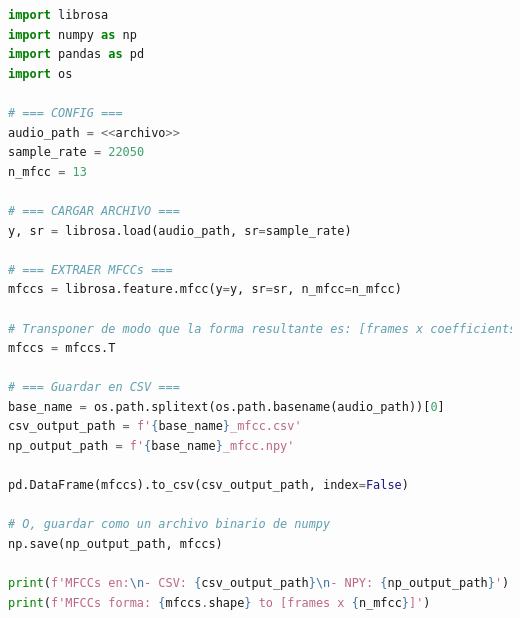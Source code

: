 \documentclass[12pt]{report}
\begin{document}
\begin{lstlisting}[language=Python, caption={Prueba para extracción de características.}, label={lst:test_mfcc}]
import librosa
import numpy as np
import pandas as pd
import os

# === CONFIG ===
audio_path = <<archivo>>
sample_rate = 22050
n_mfcc = 13

# === CARGAR ARCHIVO ===
y, sr = librosa.load(audio_path, sr=sample_rate)

# === EXTRAER MFCCs ===
mfccs = librosa.feature.mfcc(y=y, sr=sr, n_mfcc=n_mfcc)

# Transponer de modo que la forma resultante es: [frames x coefficients]
mfccs = mfccs.T

# === Guardar en CSV ===
base_name = os.path.splitext(os.path.basename(audio_path))[0]
csv_output_path = f'{base_name}_mfcc.csv'
np_output_path = f'{base_name}_mfcc.npy'

pd.DataFrame(mfccs).to_csv(csv_output_path, index=False)

# O, guardar como un archivo binario de numpy
np.save(np_output_path, mfccs)

print(f'MFCCs en:\n- CSV: {csv_output_path}\n- NPY: {np_output_path}')
print(f'MFCCs forma: {mfccs.shape} to [frames x {n_mfcc}]')
\end{lstlisting}
\end{document}
